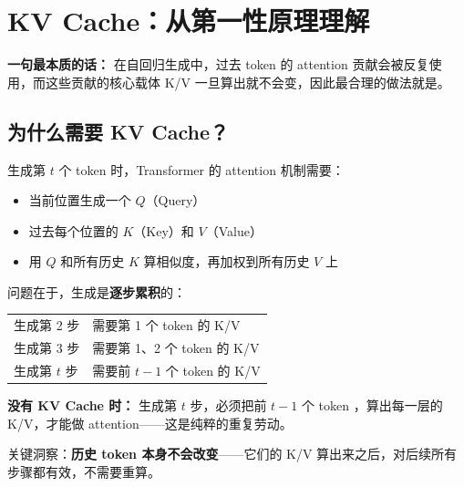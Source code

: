
\section{KV Cache：从第一性原理理解}

\begin{conceptbox}
\textbf{一句最本质的话：} 在自回归生成中，过去 token 的 attention 贡献会被反复使用，而这些贡献的核心载体 K/V 一旦算出就不会变，因此最合理的做法就是。
\end{conceptbox}

\subsection{为什么需要 KV Cache？}

生成第 $t$ 个 token 时，Transformer 的 attention 机制需要：

\begin{itemize}[leftmargin=1.5em]
  \item 当前位置生成一个 $Q$（Query）
  \item 过去每个位置的 $K$（Key）和 $V$（Value）
  \item 用 $Q$ 和所有历史 $K$ 算相似度，再加权到所有历史 $V$ 上
\end{itemize}

问题在于，生成是\textbf{逐步累积}的：

\begin{center}
{\small
\begin{tabular}{p{2cm}p{10.5cm}}
\hline
生成第 2 步 & 需要第 1 个 token 的 K/V \\
生成第 3 步 & 需要第 1、2 个 token 的 K/V \\
生成第 $t$ 步 & 需要前 $t-1$ 个 token 的 K/V \\
\hline
\end{tabular}
}
\end{center}

\begin{warnbox}
\textbf{没有 KV Cache 时：} 生成第 $t$ 步，必须把前 $t-1$ 个 token ，算出每一层的 K/V，才能做 attention——这是纯粹的重复劳动。
\end{warnbox}

关键洞察：\textbf{历史 token 本身不会改变}——它们的 K/V 算出来之后，对后续所有步骤都有效，不需要重算。

